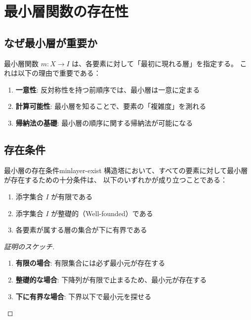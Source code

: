 \documentclass[a4paper,12pt]{ltjsarticle}
\begin{document}
\section{最小層関数の存在性}

\subsection{なぜ最小層が重要か}

最小層関数 $m : X \to I$ は、各要素に対して「最初に現れる層」を指定する。
これは以下の理由で重要である：

\begin{enumerate}
    \item \textbf{一意性}: 反対称性を持つ前順序では、最小層は一意に定まる
    \item \textbf{計算可能性}: 最小層を知ることで、要素の「複雑度」を測れる
    \item \textbf{帰納法の基礎}: 最小層の順序に関する帰納法が可能になる
\end{enumerate}

\subsection{存在条件}

\begin{theorem}{最小層の存在条件}{minlayer-exist}
構造塔において、すべての要素に対して最小層が存在するための十分条件は、
以下のいずれかが成り立つことである：

\begin{enumerate}
    \item 添字集合 $I$ が有限である
    \item 添字集合 $I$ が整礎的（Well-founded）である
    \item 各要素が属する層の集合が下に有界である
\end{enumerate}
\end{theorem}

\begin{proof}[証明のスケッチ]
\begin{enumerate}
    \item \textbf{有限の場合}: 有限集合には必ず最小元が存在する
    \item \textbf{整礎的な場合}: 下降列が有限で止まるため、最小元が存在する
    \item \textbf{下に有界な場合}: 下界以下で最小元を探せる
\end{enumerate}
\end{proof}
\end{document}
